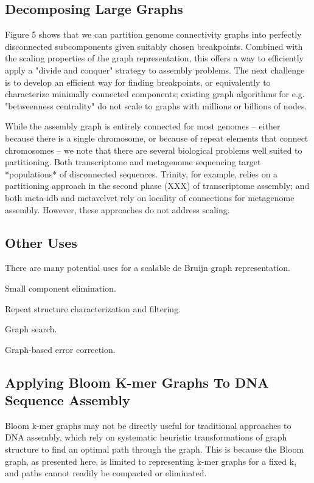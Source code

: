 \documentclass[12pt]{article} \usepackage{simplemargins}
\begin{document}
\subsection{Decomposing Large Graphs}
Figure 5 shows that we can partition
genome connectivity graphs into perfectly disconnected subcomponents
given suitably chosen breakpoints.  Combined with the scaling
properties of the graph representation, this offers a way to
efficiently apply a "divide and conquer" strategy to assembly
problems.  The next challenge is to develop an efficient way for
finding breakpoints, or equivalently to characterize minimally
connected components; existing graph algorithms for e.g. "betweenness
centrality" do not scale to graphs with millions or billions of nodes.

While the assembly graph is entirely connected for most genomes --
either because there is a single chromosome, or because of repeat
elements that connect chromosomes -- we note that there are several
biological problems well suited to partitioning.  Both transcriptome
and metagenome sequencing target *populations* of disconnected
sequences.  Trinity, for example, relies on a partitioning approach in
the second phase (XXX) of transcriptome assembly; and both meta-idb
and metavelvet rely on locality of connections for metagenome
assembly.  However, these approaches do not address scaling.

\subsection{Other Uses}

There are many potential uses for a scalable de Bruijn graph representation. 

Small component elimination.

Repeat structure characterization and filtering.

Graph search.

Graph-based error correction.

\subsection{Applying Bloom K-mer Graphs To DNA Sequence Assembly}
Bloom k-mer graphs may not be directly useful for traditional
approaches to DNA assembly, which rely on systematic heuristic
transformations of graph structure to find an optimal path through the
graph.  This is because the Bloom graph, as presented here, is limited
to representing k-mer graphs for a fixed k, and paths cannot readily
be compacted or eliminated.
\end{document}
